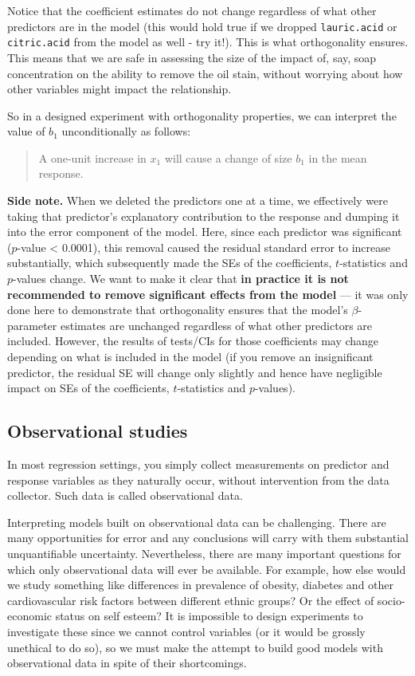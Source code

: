 \documentclass[
]{book}
\begin{document}
Notice that the coefficient estimates do not change regardless of what other predictors are in the model (this would hold true if we dropped \texttt{lauric.acid} or \texttt{citric.acid} from the model as well - try it!).
This is what orthogonality ensures.
This means that we are safe in assessing the size of the impact of, say, soap concentration on the ability to remove the oil stain, without worrying about how other variables might impact the relationship.

So in a designed experiment with orthogonality properties, we can interpret the value of \(b_1\) unconditionally as follows:

\begin{quote}
A one-unit increase in \(x_1\) will cause a change of size \(b_1\) in the mean response.
\end{quote}

\textbf{Side note.} When we deleted the predictors one at a time, we effectively were taking that predictor's explanatory contribution to the response and dumping it into the error component of the model.
Here, since each predictor was significant (\(p\)-value \textless{} 0.0001), this removal caused the residual standard error to increase substantially, which subsequently made the SEs of the coefficients, \(t\)-statistics and \(p\)-values change.
We want to make it clear that \textbf{in practice it is not recommended to remove significant effects from the model} --- it was only done here to demonstrate that orthogonality ensures that the model's \(\beta\)-parameter estimates are unchanged regardless of what other predictors are included.
However, the results of tests/CIs for those coefficients may change depending on what is included in the model (if you remove an insignificant predictor, the residual SE will change only slightly and hence have negligible impact on SEs of the coefficients, \(t\)-statistics and \(p\)-values).

\hypertarget{observational-studies-1}{%
\subsection{Observational studies}\label{observational-studies-1}}

In most regression settings, you simply collect measurements on predictor and response variables as they naturally occur, without intervention from the data collector.
Such data is called observational data.

Interpreting models built on observational data can be challenging.
There are many opportunities for error and any conclusions will carry with them substantial unquantifiable uncertainty.
Nevertheless, there are many important questions for which only observational data will ever be available.
For example, how else would we study something like differences in prevalence of obesity, diabetes and other cardiovascular risk factors between different ethnic groups?
Or the effect of socio-economic status on self esteem?
It is impossible to design experiments to investigate these since we cannot control variables (or it would be grossly unethical to do so), so we must make the attempt to build good models with observational data in spite of their shortcomings.
\end{document}
